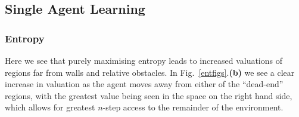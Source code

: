 \documentclass{article}
\begin{document}
\subsection{Single Agent Learning\label{singlesect}}
\subsubsection{Entropy \label{entres}}

Here we see that purely maximising entropy leads to increased valuations of regions far from walls and relative obstacles. In Fig.~\ref{entfigs}.\textbf{(b)} we see a clear increase in valuation as the agent moves away from either of the ``dead-end'' regions, with the greatest value being seen in the space on the right hand side, which allows for greatest $n$-step access to the remainder of the environment.
\end{document}
